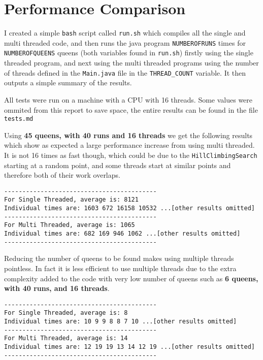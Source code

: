 \documentclass[12pt,letterpaper]{article} \usepackage{amsmath} \usepackage{graphicx} \usepackage[margin=1in]{geometry} \usepackage{longtable}  \usepackage{amssymb}
\begin{document}
	\section{Performance Comparison}
	
	I created a simple \verb*|bash| script called \verb*|run.sh| which compiles all the single and multi threaded code, and then runs the java program \verb*|NUMBEROFRUNS| times for \verb*|NUMBEROFQUEENS| queens (both variables found in \verb*|run.sh|) firstly using the single threaded program, and next using the multi threaded programs using the number of threads defined in the \verb*|Main.java| file in the \verb*|THREAD_COUNT| variable. It then outputs a simple summary of the results. 
	
	All tests were run on a machine with a CPU with 16 threads. Some values were ommited from this report to save space, the entire results can be found in the file \verb*|tests.md|
	
	Using \textbf{45 queens, with 40 runs and 16 threads} we get the following results which show as expected a large performance increase from using multi threaded. It is not 16 times as fast though, which could be due to the \verb*|HillClimbingSearch| starting at a random point, and some threads start at similar points and therefore both of their work overlaps. 

	\begin{lstlisting}
------------------------------------------
For Single Threaded, average is: 8121
Individual times are: 1603 672 16158 10532 ...[other results omitted]
------------------------------------------
For Multi Threaded, average is: 1065
Individual times are: 682 169 946 1062 ...[other results omitted]
------------------------------------------
	\end{lstlisting}
	
	Reducing the number of queens to be found makes using multiple threads pointless. In fact it is less efficient to use multiple threads due to the extra complexity added to the code with very low number of queens such as \textbf{6 queens, with 40 runs, and 16 threads}.
	
	\begin{lstlisting}
------------------------------------------
For Single Threaded, average is: 8
Individual times are: 10 9 9 8 8 7 10 ...[other results omitted]
------------------------------------------
For Multi Threaded, average is: 14
Individual times are: 12 19 19 13 14 12 19 ...[other results omitted]
------------------------------------------
	\end{lstlisting}
\end{document}
